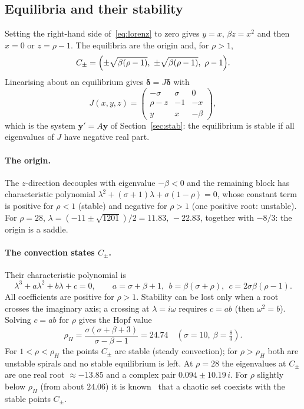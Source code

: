 \documentclass[11pt,a4paper]{article}
\newcommand{\bfy}{\mathbf{y}}
\begin{document}
\subsection{Equilibria and their stability}

Setting the right-hand side of~\eqref{eq:lorenz} to zero gives $y=x$, $\beta z=x^2$ and then
$x=0$ or $z=\rho-1$. The equilibria are the origin and, for $\rho>1$,
\begin{equation}
C_\pm=\Bigl(\pm\sqrt{\beta(\rho-1)},\ \pm\sqrt{\beta(\rho-1)},\ \rho-1\Bigr).
\end{equation}
Linearising about an equilibrium gives $\dot{\boldsymbol\delta}=J\boldsymbol\delta$ with
\begin{equation}
J(x,y,z)=\begin{pmatrix}-\sigma&\sigma&0\\ \rho-z&-1&-x\\ y&x&-\beta\end{pmatrix},
\end{equation}
which is the system $\bfy'=A\bfy$ of Section~\ref{sec:stab}: the equilibrium is stable if all
eigenvalues of $J$ have negative real part.

\paragraph{The origin.} The $z$-direction decouples with eigenvalue $-\beta<0$ and the remaining block
has characteristic polynomial $\lambda^2+(\sigma+1)\lambda+\sigma(1-\rho)=0$, whose constant term is
positive for $\rho<1$ (stable) and negative for $\rho>1$ (one positive root: unstable). For $\rho=28$,
$\lambda=(-11\pm\sqrt{1201})/2=11.83,\,-22.83$, together with $-8/3$: the origin is a saddle.

\paragraph{The convection states $C_\pm$.} Their characteristic polynomial is
\begin{equation}
\lambda^3+a\lambda^2+b\lambda+c=0,\qquad a=\sigma+\beta+1,\ \ b=\beta(\sigma+\rho),\ \ c=2\sigma\beta(\rho-1).
\end{equation}
All coefficients are positive for $\rho>1$. Stability can be lost only when a root crosses the imaginary
axis; a crossing at $\lambda=i\omega$ requires $c=ab$ (then $\omega^2=b$). Solving $c=ab$ for $\rho$ gives
the Hopf value
\begin{equation}
\rho_H=\frac{\sigma(\sigma+\beta+3)}{\sigma-\beta-1}=24.74\quad(\sigma=10,\ \beta=\tfrac83).
\end{equation}
For $1<\rho<\rho_H$ the points $C_\pm$ are stable (steady convection); for $\rho>\rho_H$ both are unstable
spirals and no stable equilibrium is left. At $\rho=28$ the eigenvalues at $C_\pm$ are one real root
$\approx-13.85$ and a complex pair $0.094\pm10.19\,i$. For $\rho$ slightly below $\rho_H$ (from about
$24.06$) it is known~\cite{sparrow1982} that a chaotic set coexists with the stable points $C_\pm$.
\end{document}
